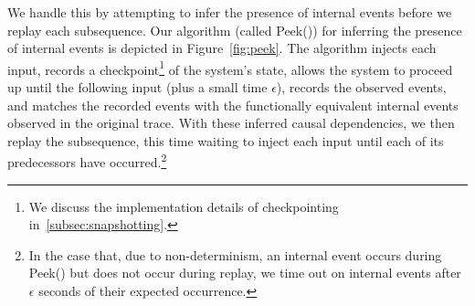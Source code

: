 We handle this by attempting to infer the presence of internal
events before we replay each subsequence. Our algorithm (called {\sc Peek()}) for inferring the
presence of internal events is depicted in
Figure~\ref{fig:peek}. The algorithm injects each input, records a checkpoint\footnote{We discuss the implementation details of checkpointing
in~\ref{subsec:snapshotting}.} of
the system's state, allows the system to proceed up
until the following input (plus a small time $\epsilon$), records the observed
events, and matches the
recorded events with the functionally equivalent internal events observed in
the original trace. With these inferred causal dependencies, we then replay
the subsequence, this time waiting to inject each input until each of its
predecessors have occurred.\footnote{In the
case that, due
to non-determinism, an internal event occurs during {\sc Peek()} but does not occur
during replay, we time out on internal events after $\epsilon$ seconds of
their expected occurrence.}


